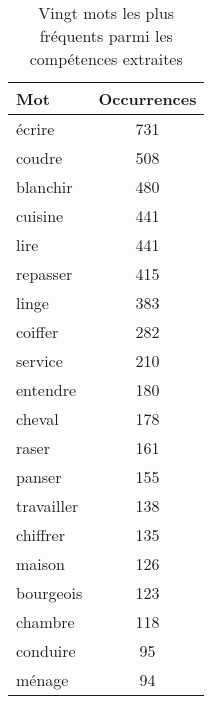 \begin{table}[ht]
		\centering
			\begin{tabular}{lc}
			\hline
			\textbf{Mot} & \textbf{Occurrences} \\ \hline
			écrire       & 731                  \\ 
			coudre       & 508                  \\ 
			blanchir     & 480                  \\ 
			cuisine      & 441                  \\ 
			lire         & 441                  \\ 
			repasser     & 415                  \\ 
			linge        & 383                  \\ 
			coiffer      & 282                  \\ 
			service      & 210                  \\ 
			entendre     & 180                  \\ 
			cheval       & 178                  \\ 
			raser        & 161                  \\ 
			panser       & 155                  \\ 
			travailler   & 138                  \\ 
			chiffrer     & 135                  \\ 
			maison       & 126                  \\ 
			bourgeois    & 123                  \\ 
			chambre      & 118                  \\ 
			conduire     & 95                   \\ 
			ménage       & 94                   \\
			\hline
		\end{tabular}
		\caption{Vingt mots les plus fréquents parmi les compétences extraites}
\end{table}

